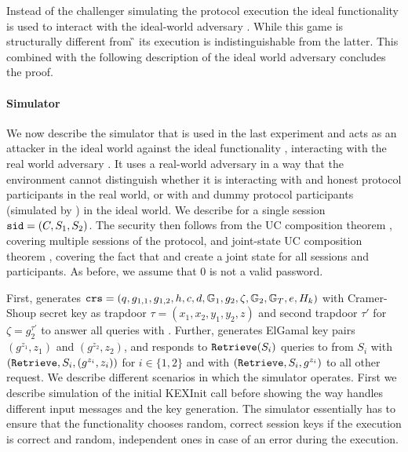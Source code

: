 \Gh Instead of the challenger \cC simulating the protocol execution the ideal functionality \FTWOPAKE is used to interact with the ideal-world adversary \SIM.
While this game is structurally different from \G{\theoldgame} its execution is indistinguishable from the latter.
This combined with the following description of the ideal world adversary \SIM concludes the proof.


\paragraph{Simulator}
We now describe the simulator \SIM that is used in the last experiment and acts as an attacker in the ideal world against the ideal functionality \FTWOPAKE, interacting with the real world adversary \cA.
It uses a real-world adversary \cA in a way that the environment \cZ cannot  distinguish whether it is interacting with \cA and honest protocol participants in the real world, or with \SIM and dummy protocol participants (simulated by \FTWOPAKE) in the ideal world.
We describe \SIM for a single session $\mathtt{sid}=(C,S_1,S_2)$.
The security then follows from the UC composition theorem \cite{Canetti2001a}, covering multiple sessions of the protocol, and joint-state UC composition theorem \cite{CanettiR03}, covering the fact that \Fca and \Fcrs create a joint state for all sessions and participants.
As before, we assume that $0$ is not a valid password.

First, \SIM generates $\mathtt{crs}=(q,g_{1,1},g_{1,2},h,c,d,\mathbb{G}_1,g_{2},\zeta,\mathbb{G}_2,\mathbb{G}_T,e,H_k)$ with Cramer-Shoup secret key as trapdoor $\tau=(x_1,x_2,y_1,y_2,z)$ and second trapdoor $\tau'$ for $\zeta=g_2^{\tau'}$ to answer all \Fcrs queries with \crs.
Further, \SIM generates ElGamal key pairs $(g^{z_1},z_1)$ and $(g^{z_2},z_2)$, and responds to $\mathtt{Retrieve}(S_i)$ queries to \Fca from $S_i$ with $(\mathtt{Retrieve}, S_i, (g^{z_i},z_i))$ for $i\in\{1,2\}$ and with $(\mathtt{Retrieve}, S_i, g^{z_i})$ to all other request.
We describe different scenarios in which the simulator operates.
First we describe simulation of the initial KEXInit call before showing the way \SIM handles different input messages and the key generation.
The simulator essentially has to ensure that the functionality chooses random, correct session keys if the execution is correct and random, independent ones in case of an error during the execution.

